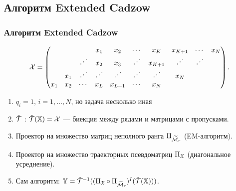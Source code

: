 \documentclass[unicode, notheorems]{beamer}
\begin{document}
\subsection{Алгоритм Extended Cadzow}




\begin{frame}
	\frametitle{Алгоритм Extended Cadzow}
	\begin{equation*}
	\mathcal{X} = \begin{pmatrix}
	&  &  & x_1 & x_2 & \cdots & x_K & x_{K+1} & \cdots & x_N \\ 
	&  & \iddots & x_2 & x_3 & \iddots & x_{K+1} & \iddots & \iddots &  \\ 
	& x_1 & \iddots & \iddots & \iddots & \iddots & \iddots & x_N &  &  \\ 
	x_1 & x_2 & \cdots & x_L & x_{L+1} & \cdots & x_N &  &  & 
	\end{pmatrix}.
	\end{equation*}
	\begin{enumerate}
		\item $q_i = 1$, $i = 1, \ldots, N$, но задача несколько иная
		\item $\tilde {\mathcal{T}}$ : $\tilde {\mathcal{T}}(\mathbb{X}) = \mathcal{X}$ --- биекция между рядами и матрицами с пропусками.
		\item Проектор на множество матриц неполного ранга $\Pi_{\widetilde {\mathcal{M}}_r}$ (EM-алгоритм).
		\item Проектор на множество траекторных псевдоматриц $\Pi_{\mathfrak{X}}$ (диагональное усреднение).
		\item Сам алгоритм: $\mathbb{Y} = \tilde {\mathcal{T}}^{-1}((\Pi_{\mathfrak{X}} \circ \Pi_{\widetilde {\mathcal{M}}_r})^I (\tilde {\mathcal{T}}(\mathbb{X})))$.
	\end{enumerate}
\end{frame}
\end{document}
